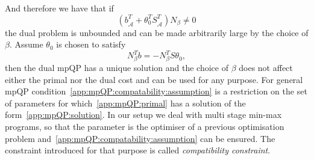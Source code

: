 \documentclass[journal]{IEEEtran}
\theoremstyle{remark}
\theoremstyle{definition}
\begin{document}
%
And therefore we have that if
%
\begin{equation}
  (b^T_{\hat{\mathcal A}}+\theta^T_0 S^T_{\hat{\mathcal A}})N_\beta \neq 0
\end{equation}
%
the dual problem is unbounded and can be made arbitrarily large by the choice of $\beta$. 
%
Assume $\theta_0$ is chosen to satisfy 
%
\begin{equation}\label{app:mpQP:compatability:assumption}
  N_\beta^Tb = -N_\beta^TS\theta_0,
\end{equation} 
%
then the dual mpQP has a unique solution and the choice of $\beta$ does not affect either the primal nor the 
dual cost and can be used for any purpose. 
%
For general mpQP condition~\eqref{app:mpQP:compatability:assumption} is a restriction on the set
of parameters for which~\eqref{app:mpQP:primal} has a solution of the form~\eqref{app:mpQP:solution}.
%
In our setup we deal with multi stage min-max programs, so that the parameter is the optimiser 
of a previous optimisation problem and~\eqref{app:mpQP:compatability:assumption} can be ensured. 
%
The constraint introduced for that purpose is called \emph{compatibility constraint}. 
\end{document}
